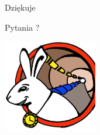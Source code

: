 \documentclass[compress,red]{beamer}
\begin{document}
\begin{frame}{Dziękuje}

    \begin{center}
    Pytania ?
    \end{center}

    
    \begin{center}
    \includegraphics[height=4.0cm]{logo/WRlogo.ps}
    \end{center}

\end{frame}
\end{document}
